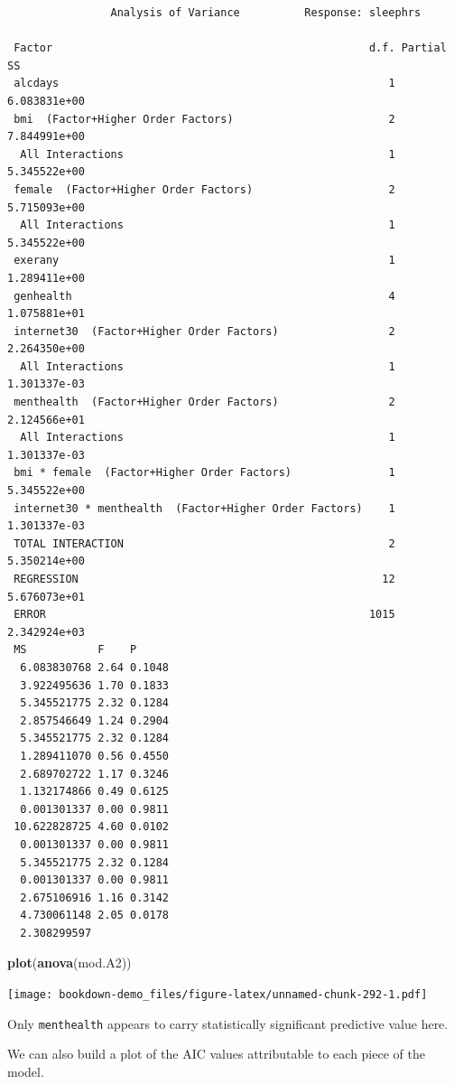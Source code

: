 \documentclass[]{book}
\newenvironment{Shaded}{\begin{snugshade}}{\end{snugshade}}
\newcommand{\KeywordTok}[1]{\textcolor[rgb]{0.13,0.29,0.53}{\textbf{#1}}}
\newcommand{\NormalTok}[1]{#1}
\theoremstyle{definition}
\theoremstyle{definition}
\theoremstyle{definition}
\theoremstyle{remark}
\begin{document}
\begin{verbatim}
                Analysis of Variance          Response: sleephrs 

 Factor                                                 d.f. Partial SS  
 alcdays                                                   1 6.083831e+00
 bmi  (Factor+Higher Order Factors)                        2 7.844991e+00
  All Interactions                                         1 5.345522e+00
 female  (Factor+Higher Order Factors)                     2 5.715093e+00
  All Interactions                                         1 5.345522e+00
 exerany                                                   1 1.289411e+00
 genhealth                                                 4 1.075881e+01
 internet30  (Factor+Higher Order Factors)                 2 2.264350e+00
  All Interactions                                         1 1.301337e-03
 menthealth  (Factor+Higher Order Factors)                 2 2.124566e+01
  All Interactions                                         1 1.301337e-03
 bmi * female  (Factor+Higher Order Factors)               1 5.345522e+00
 internet30 * menthealth  (Factor+Higher Order Factors)    1 1.301337e-03
 TOTAL INTERACTION                                         2 5.350214e+00
 REGRESSION                                               12 5.676073e+01
 ERROR                                                  1015 2.342924e+03
 MS           F    P     
  6.083830768 2.64 0.1048
  3.922495636 1.70 0.1833
  5.345521775 2.32 0.1284
  2.857546649 1.24 0.2904
  5.345521775 2.32 0.1284
  1.289411070 0.56 0.4550
  2.689702722 1.17 0.3246
  1.132174866 0.49 0.6125
  0.001301337 0.00 0.9811
 10.622828725 4.60 0.0102
  0.001301337 0.00 0.9811
  5.345521775 2.32 0.1284
  0.001301337 0.00 0.9811
  2.675106916 1.16 0.3142
  4.730061148 2.05 0.0178
  2.308299597            
\end{verbatim}

\begin{Shaded}
\begin{Highlighting}[]
\KeywordTok{plot}\NormalTok{(}\KeywordTok{anova}\NormalTok{(mod.A2))}
\end{Highlighting}
\end{Shaded}

\texttt{[image: bookdown-demo\_files/figure-latex/unnamed-chunk-292-1.pdf]}

Only \texttt{menthealth} appears to carry statistically significant
predictive value here.

We can also build a plot of the AIC values attributable to each piece of
the model.
\end{document}
